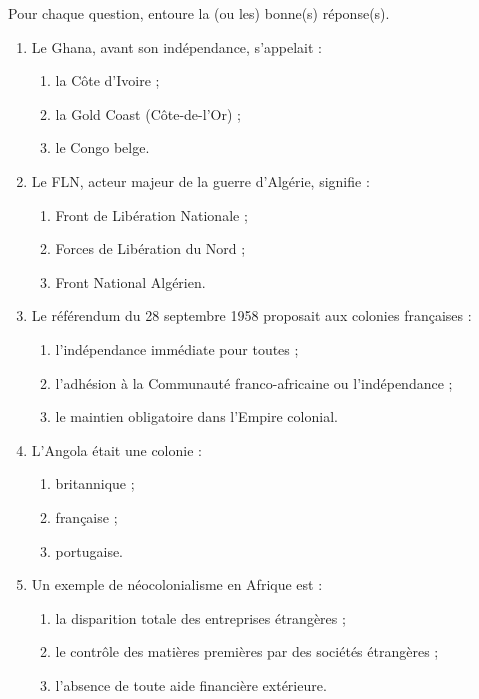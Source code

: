 \documentclass[11pt]{article}
\begin{document}
\begin{exercice}[QCM]
Pour chaque question, entoure la (ou les) bonne(s) réponse(s).
\begin{enumerate}
\item Le Ghana, avant son indépendance, s'appelait :
\begin{enumerate}
\item la Côte d'Ivoire ;
\item la Gold Coast (Côte-de-l'Or) ;
\item le Congo belge.
\end{enumerate}
\item Le FLN, acteur majeur de la guerre d'Algérie, signifie :
\begin{enumerate}
\item Front de Libération Nationale ;
\item Forces de Libération du Nord ;
\item Front National Algérien.
\end{enumerate}
\item Le référendum du 28 septembre 1958 proposait aux colonies françaises :
\begin{enumerate}
\item l'indépendance immédiate pour toutes ;
\item l'adhésion à la Communauté franco-africaine ou l'indépendance ;
\item le maintien obligatoire dans l'Empire colonial.
\end{enumerate}
\item L'Angola était une colonie :
\begin{enumerate}
\item britannique ;
\item française ;
\item portugaise.
\end{enumerate}
\item Un exemple de néocolonialisme en Afrique est :
\begin{enumerate}
\item la disparition totale des entreprises étrangères ;
\item le contrôle des matières premières par des sociétés étrangères ;
\item l'absence de toute aide financière extérieure.
\end{enumerate}
\end{enumerate}
\end{exercice}
\end{document}
